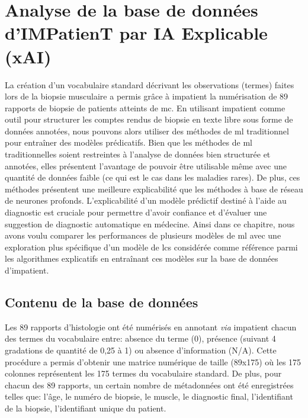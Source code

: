 \chapter{Analyse de la base de données d’IMPatienT par IA Explicable (xAI)}

La création d'un vocabulaire standard décrivant les observations (termes) faites lors de la biopsie musculaire a permis grâce à \gls{impatient} la numérisation de 89 rapports de biopsie de patients atteints de \gls{mc}. En utilisant \gls{impatient} comme outil pour structurer les comptes rendus de biopsie en texte libre sous forme de données annotées, nous pouvons alors utiliser des méthodes de \gls{ml} traditionnel pour entraîner des modèles prédicatifs. Bien que les méthodes de \gls{ml} traditionnelles soient restreintes à l'analyse de données bien structurée et annotées, elles présentent l'avantage de pouvoir être utilisable même avec une quantité de données faible (ce qui est le cas dans les maladies rares). De plus, ces méthodes présentent une meilleure explicabilité que les méthodes à base de réseau de neurones profonds. L'explicabilité d'un modèle prédictif destiné à l'aide au diagnostic est cruciale pour permettre d'avoir confiance et d'évaluer une suggestion de diagnostic automatique en médecine. Ainsi dans ce chapitre, nous avons voulu comparer les performances de plusieurs modèles de \gls{ml} avec une exploration plus spécifique d'un modèle de \gls{lcs} considérée comme référence parmi les algorithmes explicatifs en entraînant ces modèles sur la base de données d'\gls{impatient}.

\section{Contenu de la base de données}
Les 89 rapports d'histologie ont été numérisés en annotant \textit{via} \gls{impatient} chacun des termes du vocabulaire entre: absence du terme (0), présence (suivant 4 gradations de quantité de 0,25 à 1) ou absence d'information (N/A).  Cette procédure a permis d'obtenir une matrice numérique de taille (89x175) où les 175 colonnes représentent les 175 termes du vocabulaire standard. De plus, pour chacun des 89 rapports, un certain nombre de métadonnées ont été enregistrées telles que: l'âge, le numéro de biopsie, le muscle, le diagnostic final, l'identifiant de la biopsie, l'identifiant unique du patient.
